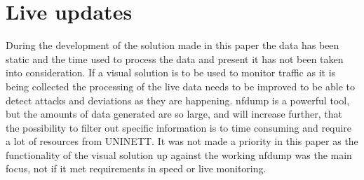 \section{Live updates}
During the development of the solution made in this paper the data has been static and the time used to process the data and present it has not been taken into consideration. If a visual solution is to be used to monitor traffic as it is being collected the processing of the live data needs to be improved to be able to detect attacks and deviations as they are happening. nfdump is a powerful tool, but the amounts of data generated are so large, and will increase further, that the possibility to filter out specific information is to time consuming and require a lot of resources from UNINETT. 
It was not made a priority in this paper as the functionality of the visual solution up against the working nfdump was the main focus, not if it met requirements in speed or live monitoring. 


